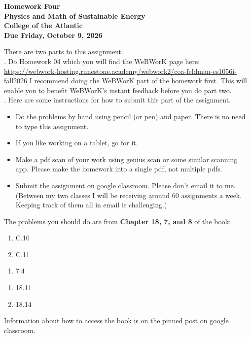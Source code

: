 \documentclass[12pt]{article}
\begin{document}
\pagestyle{empty}
 
\begin{center}
{\LARGE {\bf Homework Four}}\\
\bigskip
{\Large {\bf Physics and Math of Sustainable Energy}}\\
\bigskip
{\Large {\bf College of the Atlantic}}\\
\bigskip
{ {\bf Due Friday, October 9, 2026}}\\ 
\end{center}
\medskip


\noindent There are two parts to this assignment.\\

.  Do Homework 04 which you
will find the WeBWorK page here: \url{https://webwork-hosting.runestone.academy/webwork2/coa-feldman-es1056i-fall2026}
I recommend doing the WeBWorK part of the homework first.  This will
enable you to benefit WeBWorK's instant feedback before you do part
two.\\ 


.  Here are some
instructions for how to submit this part of the assignment.
\begin{itemize}
\item Do the problems by hand using pencil (or pen) and paper.
  There is no need to type this assignment.
\item If you like working on a tablet, go for it. 
\item Make a pdf scan of your work using genius scan or some
  similar scanning app.  Please make the homework into a single
  pdf, not multiple pdfs.
\item Submit the assignment on google classroom.  Please don't
  email it to me.  (Between my two classes I will be receiving
  around 60 assignments a week.  Keeping track of them all in email 
  is challenging.)\\
\end{itemize}

\noindent The problems you should do are from {\bf Chapter 18, 7, and
  8} of the book: \\

\begin{enumerate}
\setlength{\itemsep}{-1mm}
  \item C.10
  \item C.11
\end{enumerate}

\begin{enumerate}
\setlength{\itemsep}{-1mm}
\item 7.4
\end{enumerate}

\begin{enumerate}
\setlength{\itemsep}{-1mm}
\item 18.11
\item 18.14 
\end{enumerate}

\noindent Information about how to access the book is on the
pinned post on google classroom. 
\end{document}
